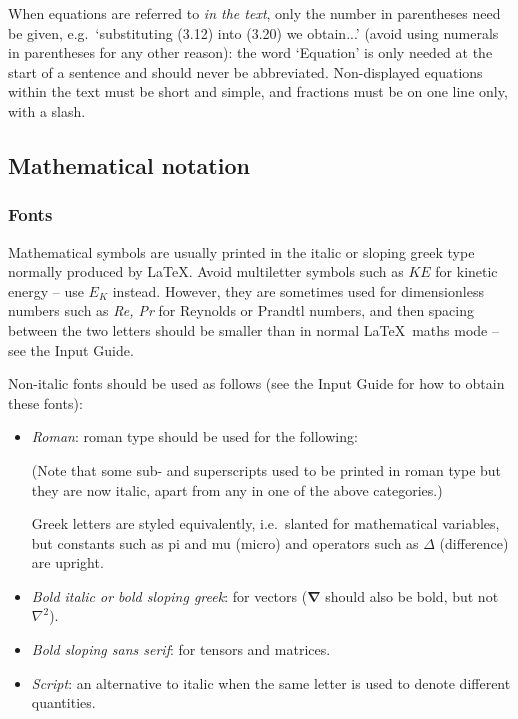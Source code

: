 \documentclass{jfm}
\providecommand\bnabla{\boldsymbol{\nabla}}
\begin{document}
When equations are referred to \emph{in the text}, only the number in
parentheses need be given, e.g.\ `substituting (3.12) into (3.20) we
obtain...' (avoid using numerals in parentheses for any other reason): the
word `Equation' is only needed at the start of a sentence and should never
be abbreviated. Non-displayed equations within the text must be short and
simple, and fractions must be on one line only, with a slash.

\subsection{Mathematical notation}

\subsubsection{Fonts}

Mathematical symbols are usually printed in the italic or sloping greek
type normally produced by \LaTeX. Avoid multiletter symbols such as
$KE$ for kinetic energy -- use $E_{K}$ instead. However, they are
sometimes used for dimensionless numbers such as \textit{Re, Pr} for Reynolds
or Prandtl numbers, and then spacing between the two letters should
be smaller than in normal \LaTeX\ maths mode -- see the Input Guide.

Non-italic fonts should be used as follows (see the Input Guide for
how to obtain these fonts):
\begin{itemize}
\item
\emph{Roman}: roman type should be used for the following:

(Note that some sub- and superscripts used to be printed in roman type
but they are now italic, apart from any in one of the above
categories.)

Greek letters are styled equivalently, i.e.\ slanted for mathematical
variables, but constants such as pi and mu (micro) and operators such
as $\Delta$ (difference) are upright.
\item
\emph{Bold italic or bold sloping greek}: for vectors
($\bnabla$ should also be bold, but not $\nabla^{2}$).
\item
\emph{Bold sloping sans serif}: for tensors and matrices.
\item
\emph{Script}: an alternative to italic when the same letter is used
to denote different quantities.
\end{itemize}
\end{document}

